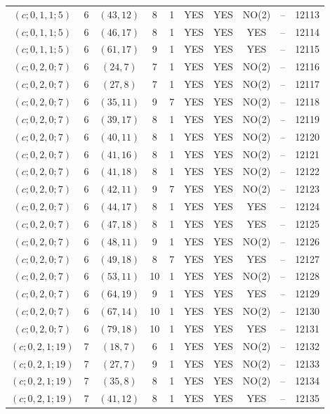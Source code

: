 \begin{longtable}{|c|c|c|c|c|c|c|c|c|c|}
$(c; 0, 1, 1; 5)$ & 6 & $(43, 12)$ & 8 & 1 & YES & YES & NO(2) & -- & 12113\\
$(c; 0, 1, 1; 5)$ & 6 & $(46, 17)$ & 8 & 1 & YES & YES & YES & -- & 12114\\
$(c; 0, 1, 1; 5)$ & 6 & $(61, 17)$ & 9 & 1 & YES & YES & YES & -- & 12115\\
$(c; 0, 2, 0; 7)$ & 6 & $(24, 7)$ & 7 & 1 & YES & YES & NO(2) & -- & 12116\\
$(c; 0, 2, 0; 7)$ & 6 & $(27, 8)$ & 7 & 1 & YES & YES & NO(2) & -- & 12117\\
$(c; 0, 2, 0; 7)$ & 6 & $(35, 11)$ & 9 & 7 & YES & YES & NO(2) & -- & 12118\\
$(c; 0, 2, 0; 7)$ & 6 & $(39, 17)$ & 8 & 1 & YES & YES & NO(2) & -- & 12119\\
$(c; 0, 2, 0; 7)$ & 6 & $(40, 11)$ & 8 & 1 & YES & YES & NO(2) & -- & 12120\\
$(c; 0, 2, 0; 7)$ & 6 & $(41, 16)$ & 8 & 1 & YES & YES & NO(2) & -- & 12121\\
$(c; 0, 2, 0; 7)$ & 6 & $(41, 18)$ & 8 & 1 & YES & YES & NO(2) & -- & 12122\\
$(c; 0, 2, 0; 7)$ & 6 & $(42, 11)$ & 9 & 7 & YES & YES & NO(2) & -- & 12123\\
$(c; 0, 2, 0; 7)$ & 6 & $(44, 17)$ & 8 & 1 & YES & YES & YES & -- & 12124\\
$(c; 0, 2, 0; 7)$ & 6 & $(47, 18)$ & 8 & 1 & YES & YES & YES & -- & 12125\\
$(c; 0, 2, 0; 7)$ & 6 & $(48, 11)$ & 9 & 1 & YES & YES & NO(2) & -- & 12126\\
$(c; 0, 2, 0; 7)$ & 6 & $(49, 18)$ & 8 & 7 & YES & YES & YES & -- & 12127\\
$(c; 0, 2, 0; 7)$ & 6 & $(53, 11)$ & 10 & 1 & YES & YES & NO(2) & -- & 12128\\
$(c; 0, 2, 0; 7)$ & 6 & $(64, 19)$ & 9 & 1 & YES & YES & YES & -- & 12129\\
$(c; 0, 2, 0; 7)$ & 6 & $(67, 14)$ & 10 & 1 & YES & YES & NO(2) & -- & 12130\\
$(c; 0, 2, 0; 7)$ & 6 & $(79, 18)$ & 10 & 1 & YES & YES & YES & -- & 12131\\
$(c; 0, 2, 1; 19)$ & 7 & $(18, 7)$ & 6 & 1 & YES & YES & NO(2) & -- & 12132\\
$(c; 0, 2, 1; 19)$ & 7 & $(27, 7)$ & 9 & 1 & YES & YES & NO(2) & -- & 12133\\
$(c; 0, 2, 1; 19)$ & 7 & $(35, 8)$ & 8 & 1 & YES & YES & NO(2) & -- & 12134\\
$(c; 0, 2, 1; 19)$ & 7 & $(41, 12)$ & 8 & 1 & YES & YES & YES & -- & 12135\\

\end{longtable}
